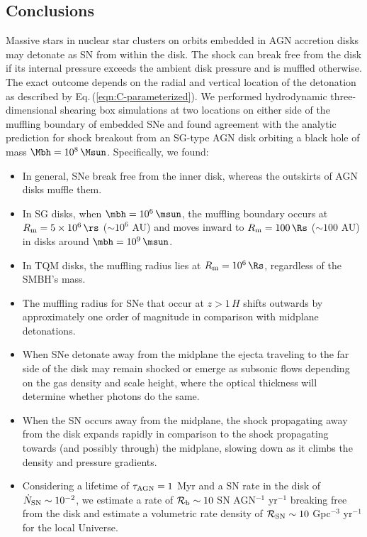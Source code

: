 
\subsection{Conclusions}
\label{sec:conclusions-ch3}
Massive stars in nuclear star clusters on orbits embedded in AGN accretion disks may detonate as SN from within the disk.
The shock can break free from the disk if its internal pressure exceeds the ambient disk pressure and is muffled otherwise.
The exact outcome depends on the radial and vertical location of the detonation as described by Eq.\,(\ref{eqn:C-parameterized}).
We performed hydrodynamic three-dimensional shearing box simulations at two locations on either side of the muffling boundary of embedded SNe and found agreement with the analytic prediction for shock breakout from an SG-type AGN disk orbiting a black hole of mass $\Mbh=10^8\,\Msun$.
Specifically, we found:

\begin{itemize}
    \item In general, SNe break free from the inner disk, whereas the outskirts of AGN disks muffle them.
    \item In SG disks, when $\mbh=10^6\,\msun$, the muffling boundary occurs at $R_{\rm m}=5\times10^6\,\rs$ ($\sim10^6$ AU) and moves inward to $R_{\rm m}=100\,\Rs$ ($\sim100$ AU) in disks around $\mbh=10^9\,\msun$.
    \item In TQM disks, the muffling radius lies at $R_{\rm m}=10^6\,\Rs$, regardless of the SMBH's mass.
    \item The muffling radius for SNe that occur at $z>1\,H$ shifts outwards by approximately one order of magnitude in comparison with midplane detonations.
    \item When SNe detonate away from the midplane the ejecta traveling to the far side of the disk may remain shocked or emerge as subsonic flows depending on the gas density and scale height, where the optical thickness will determine whether photons do the same.
    \item When the SN occurs away from the midplane, the shock propagating away from the disk expands rapidly in comparison to the shock propagating towards (and possibly through) the midplane, slowing down as it climbs the density and pressure gradients.
    \item Considering a lifetime of $\tau_{\rm AGN}=1$ Myr and a SN rate in the disk of $\dot{N}_{\rm SN} \sim 10^{-2}$, we estimate a rate of $\mathcal{R}_{\rm b} \sim 10$ SN AGN$^{-1}$ yr$^{-1}$ breaking free from the disk and estimate a volumetric rate density of $\mathcal{R}_{\rm SN} \sim 10$ Gpc$^{-3}$ yr$^{-1}$ for the local Universe.
\end{itemize}


